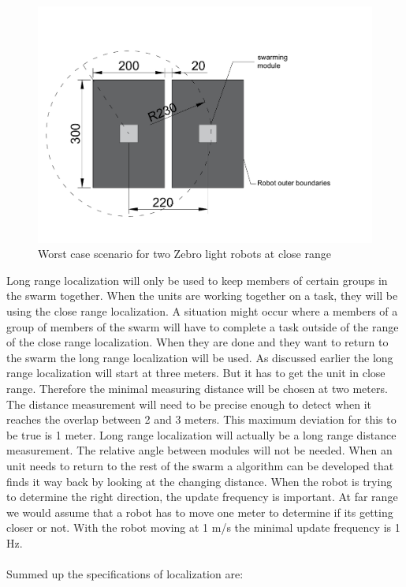 \documentclass[10pt,a4paper]{article}
\begin{document}
\begin{figure}[H]
        \centering
        \graphicspath{ {./images/} }
        \includegraphics[scale=.3]{smrange.pdf}
        \caption{Worst case scenario for two Zebro light robots at close range}
        \label{fig:smrange}
\end{figure}


Long range localization will only be used to keep members of certain groups in the swarm together. When the units are working together on a task, they will be using the close range localization. A situation might occur where a members of a group of members of the swarm will have to complete a task outside of the range of the close range localization. When they are done and they want to return to the swarm the long range localization will be used. As discussed earlier the long range localization will start at three meters. But it has to get the unit in close range. Therefore the minimal measuring distance will be chosen at two meters. The distance measurement will need to be precise enough to detect when it reaches the overlap between 2 and 3 meters. This maximum deviation for this to be true is 1 meter. Long range localization will actually be a long range distance measurement. The relative angle between modules will not be needed. When an unit needs to return to the rest of the swarm a algorithm can be developed that finds it way back by looking at the changing distance. When the robot is trying to determine the right direction, the update frequency is important. At far range we would assume that a robot has to move one meter to determine if its getting closer or not. With the robot moving at 1 m/s the minimal update frequency is 1 Hz. \\\\
Summed up the specifications of localization are:
\end{document}
